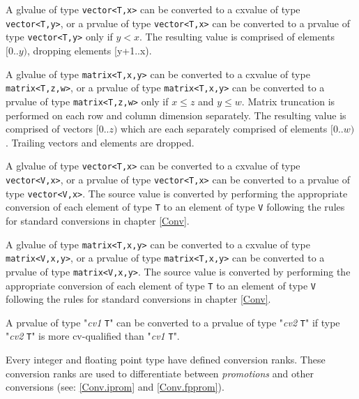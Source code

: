 
\p A glvalue of type \texttt{vector<T,x>} can be converted to a cxvalue of type
\texttt{vector<T,y>}, or a prvalue of type \texttt{vector<T,x>} can be converted
to a prvalue of type \texttt{vector<T,y>} only if \( y < x \). The resulting
value is comprised of elements \( [0..y) \), dropping elements [y+1..x).

\p A glvalue of type \texttt{matrix<T,x,y>} can be converted to a cxvalue of type
\texttt{matrix<T,z,w>}, or a prvalue of type \texttt{matrix<T,x,y>} can be
converted to a prvalue of type \texttt{matrix<T,z,w>} only if \( x \leq z \)
and \(y \leq w \). Matrix truncation is performed on each row and column
dimension separately. The resulting value is comprised of vectors \( [0..z) \)
which are each separately comprised of elements \( [0..w) \). Trailing vectors
and elements are dropped.


\p A glvalue of type \texttt{vector<T,x>} can be converted to a cxvalue of type
\texttt{vector<V,x>}, or a prvalue of type \texttt{vector<T,x>} can be converted
to a prvalue of type \texttt{vector<V,x>}. The source value is converted by
performing the appropriate conversion of each element of type \texttt{T} to an
element of type \texttt{V} following the rules for standard conversions
in chapter \ref{Conv}.

\p A glvalue of type \texttt{matrix<T,x,y>} can be converted to a cxvalue of
type \texttt{matrix<V,x,y>}, or a prvalue of type \texttt{matrix<T,x,y>} can be
converted to a prvalue of type \texttt{matrix<V,x,y>}. The source value is
converted by performing the appropriate conversion of each element of type
\texttt{T} to an element of type \texttt{V} following the rules for standard
conversions in chapter \ref{Conv}.


A prvalue of type "\textit{cv1} \texttt{T}" can be converted to a prvalue of type
"\textit{cv2} \texttt{T}" if type "\textit{cv2} \texttt{T}" is more cv-qualified
than "\textit{cv1} \texttt{T}".


\p Every integer and floating point type have defined conversion ranks. These
conversion ranks are used to differentiate between \textit{promotions} and other
conversions (see: \ref{Conv.iprom} and \ref{Conv.fpprom}).

